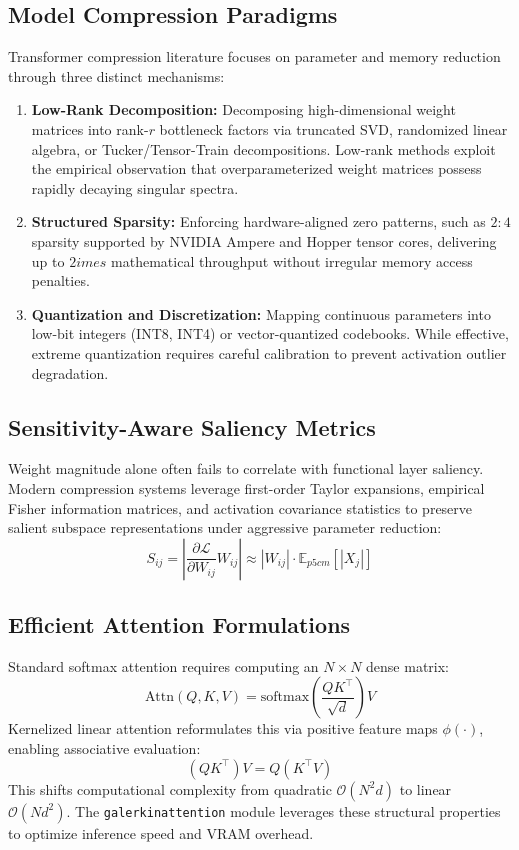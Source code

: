 \subsection{Model Compression Paradigms}
Transformer compression literature focuses on parameter and memory reduction through three distinct mechanisms:
\begin{enumerate}
\item \textbf{Low-Rank Decomposition:} Decomposing high-dimensional weight matrices into rank-$r$ bottleneck factors via truncated SVD, randomized linear algebra, or Tucker/Tensor-Train decompositions. Low-rank methods exploit the empirical observation that overparameterized weight matrices possess rapidly decaying singular spectra.
\item \textbf{Structured Sparsity:} Enforcing hardware-aligned zero patterns, such as $2:4$ sparsity supported by NVIDIA Ampere and Hopper tensor cores, delivering up to $2	imes$ mathematical throughput without irregular memory access penalties.
\item \textbf{Quantization and Discretization:} Mapping continuous parameters into low-bit integers (INT8, INT4) or vector-quantized codebooks. While effective, extreme quantization requires careful calibration to prevent activation outlier degradation.
\end{enumerate}

\subsection{Sensitivity-Aware Saliency Metrics}
Weight magnitude alone often fails to correlate with functional layer saliency. Modern compression systems leverage first-order Taylor expansions, empirical Fisher information matrices, and activation covariance statistics to preserve salient subspace representations under aggressive parameter reduction:
\[
S_{ij} = \left| \frac{\partial \mathcal{L}}{\partial W_{ij}} W_{ij} \right| \approx |W_{ij}| \cdot \mathbb{E}_{p{5cm}}[|X_j|]
\]

\subsection{Efficient Attention Formulations}
Standard softmax attention requires computing an $N \times N$ dense matrix:
\[
\text{Attn}(Q, K, V) = \text{softmax}\left(\frac{Q K^\top}{\sqrt{d}}\right) V
\]
Kernelized linear attention reformulates this via positive feature maps $\phi(\cdot)$, enabling associative evaluation:
\[
(Q K^\top) V = Q (K^\top V)
\]
This shifts computational complexity from quadratic $\mathcal{O}(N^2 d)$ to linear $\mathcal{O}(N d^2)$. The \texttt{galerkinattention} module leverages these structural properties to optimize inference speed and VRAM overhead.


